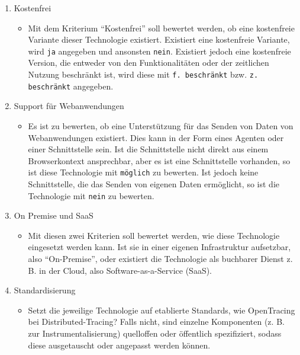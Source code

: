 \begin{enumerate}
	\item Kostenfrei
	\begin{itemize}
		\item Mit dem Kriterium \enquote{Kostenfrei} soll bewertet werden, ob eine kostenfreie Variante dieser Technologie existiert. Existiert eine kostenfreie Variante, wird \texttt{ja} angegeben und ansonsten \texttt{nein}. Existiert jedoch eine kostenfreie Version, die entweder von den Funktionalitäten oder der zeitlichen Nutzung beschränkt ist, wird diese mit \texttt{f. beschränkt} bzw. \texttt{z. beschränkt} angegeben.
	\end{itemize}

	\item Support für Webanwendungen
	\begin{itemize}
		\item Es ist zu bewerten, ob eine Unterstützung für das Senden von Daten von Webanwendungen existiert. Dies kann in der Form eines Agenten\footnotemark{} oder einer Schnittstelle sein. Ist die Schnittstelle nicht direkt aus einem Browserkontext ansprechbar, aber es ist eine Schnittstelle vorhanden, so ist diese Technologie mit \texttt{möglich} zu bewerten. Ist jedoch keine Schnittstelle, die das Senden von eigenen Daten ermöglicht, so ist die Technologie mit \texttt{nein} zu bewerten.
	\end{itemize}

	\item On Premise und SaaS
	\begin{itemize}
		\item Mit diesen zwei Kriterien soll bewertet werden, wie diese Technologie eingesetzt werden kann. Ist sie in einer eigenen Infrastruktur aufsetzbar, also \enquote{On-Premise}, oder existiert die Technologie als buchbarer Dienst z. B. in der Cloud, also Software-as-a-Service (SaaS).
	\end{itemize}

	\item Standardisierung
	\begin{itemize}
		\item Setzt die jeweilige Technologie auf etablierte Standards, wie OpenTracing bei Distributed-Tracing? Falls nicht, sind einzelne Komponenten (z. B. zur Instrumentalisierung) quelloffen oder öffentlich spezifiziert, sodass diese ausgetauscht oder angepasst werden können.
	\end{itemize}


\end{enumerate}
